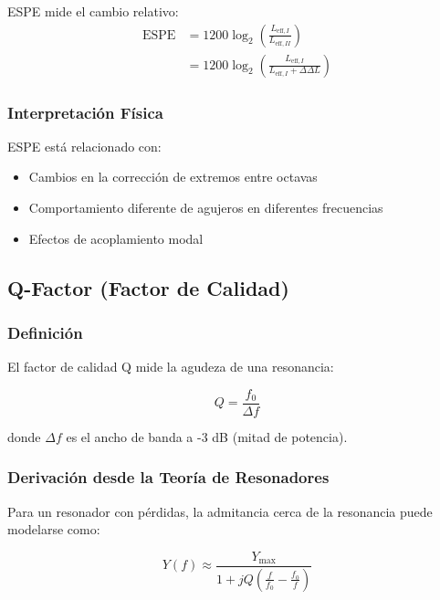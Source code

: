 \documentclass[12pt,a4paper,twocolumn]{article}
\newcommand{\admittance}{Y}
\newcommand{\freqzero}{f_0}
\begin{document}
ESPE mide el cambio relativo:
\begin{align}
\text{ESPE} &= 1200 \log_2\left(\frac{L_{\text{eff},I}}{L_{\text{eff},II}}\right) \\
&= 1200 \log_2\left(\frac{L_{\text{eff},I}}{L_{\text{eff},I} + \Delta\Delta L}\right)
\label{eq:espe_deriv}
\end{align}

\subsubsection{Interpretación Física}

ESPE está relacionado con:
\begin{itemize}
    \item Cambios en la corrección de extremos entre octavas
    \item Comportamiento diferente de agujeros en diferentes frecuencias
    \item Efectos de acoplamiento modal
\end{itemize}

\subsection{Q-Factor (Factor de Calidad)}

\subsubsection{Definición}

El factor de calidad Q mide la agudeza de una resonancia:

\begin{equation}
Q = \frac{\freqzero}{\Delta f}
\label{eq:q_factor}
\end{equation}

donde $\Delta f$ es el ancho de banda a -3 dB (mitad de potencia).

\subsubsection{Derivación desde la Teoría de Resonadores}

Para un resonador con pérdidas, la admitancia cerca de la resonancia puede modelarse como:

\begin{equation}
\admittance(f) \approx \frac{\admittance_{\max}}{1 + j Q \left(\frac{f}{\freqzero} - \frac{\freqzero}{f}\right)}
\label{eq:admittance_resonator}
\end{equation}
\end{document}
